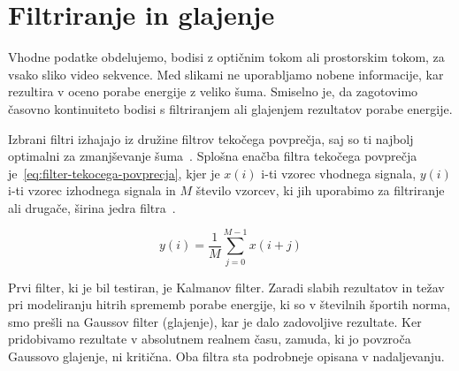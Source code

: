 \section{Filtriranje in glajenje}\label{sec:filtri}
Vhodne podatke obdelujemo, bodisi z optičnim tokom ali prostorskim tokom, za vsako sliko video sekvence. Med slikami ne uporabljamo nobene informacije, kar rezultira v oceno porabe energije z veliko šuma. Smiselno je, da zagotovimo časovno kontinuiteto bodisi s filtriranjem ali glajenjem rezultatov porabe energije.

Izbrani filtri izhajajo iz družine filtrov tekočega povprečja, saj so ti najbolj optimalni za zmanjševanje šuma~\cite{smith1997scientist}. Splošna enačba filtra tekočega povprečja je~\eqref{eq:filter-tekocega-povprecja}, kjer je $x(i)$ i-ti vzorec vhodnega signala, $y(i)$ i-ti vzorec izhodnega signala in $M$ število vzorcev, ki jih uporabimo za filtriranje ali drugače, širina jedra filtra~\cite{smith1997scientist}.

\begin{equation}
y(i) = \frac{1}{M} \sum_{j=0}^{M-1} x(i + j)
\label{eq:filter-tekocega-povprecja}
\end{equation}

Prvi filter, ki je bil testiran, je Kalmanov filter. Zaradi slabih rezultatov in težav pri modeliranju hitrih sprememb porabe energije, ki so v številnih športih norma, smo prešli na Gaussov filter (glajenje), kar je dalo zadovoljive rezultate. Ker pridobivamo rezultate v absolutnem realnem času, zamuda, ki jo povzroča Gaussovo glajenje, ni kritična. Oba filtra sta podrobneje opisana v nadaljevanju.





